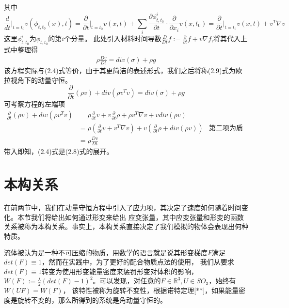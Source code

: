 其中$$\frac{d}{dt}\Big |_{t = t_0} v(\phi_{t,t_0}(x),t) = \frac{\partial}{\partial t}\Big |_{t = t_0}v(x,t) + \sum_i \frac{\partial \phi_{t,t_0}^i}{\partial t}  \cdot \frac{\partial}{\partial x_i}v(x,t_0) = \frac{\partial}{\partial t}\Big |_{t = t_0}v(x,t) + v^T\nabla v$$
这里$\phi_{t,t_0}^i$为$\phi_{t,t_0}$的第$i$个分量。
此处引入材料时间导数$\frac{D}{Dt}f := \frac{\partial}{\partial t} f + v\nabla f $,将其代入上式中整理得
\begin{equation}
    \begin{split}
        \rho \frac{Dv}{Dt} = div(\sigma) + \rho g
    \end{split}
\end{equation}
该方程实际与(2.4)式等价，由于其更简洁的表述形式，我们之后将称(2.9)式为欧拉视角下的动量守恒。
$$\frac{\partial}{\partial t}(\rho v) + div(\rho v^{T}v) = div(\sigma) + \rho g$$
可考察方程的左端项
\begin{align*}
    \frac{\partial}{\partial t}(\rho v) + div(\rho v^{T}v) & = \rho \frac{\partial}{\partial t} v + v \frac{\partial}{\partial t} \rho + \rho v^T\nabla v + v div(\rho v)                           \\
                                                           & = \rho (\frac{\partial}{\partial t} v + v^T\nabla v) + v(\frac{\partial}{\partial t} \rho + div(\rho v))     & \text{第二项为质量守恒} \\
                                                           & = \rho \frac{Dv}{Dt}
\end{align*}
带入即知，(2.4)式是(2.8)式的展开。

\section{本构关系}
在前两节中，我们在动量守恒方程中引入了应力项，其决定了速度如何随着时间变化。本节我们将给出如何通过形变来给出
应变张量，其中应变张量和形变的函数关系被称为本构关系。事实上，本构关系直接决定了我们模拟的物体会表现出何种特质。

流体被认为是一种不可压缩的物质，用数学的语言就是说其形变梯度$F$满足$det(F)\equiv 1$，然而在实践中，为了更好的配合物质点法的使用，
我们从要求$det(F)\equiv 1$转变为使用形变能量密度来惩罚形变对体积的影响，$W(F):= \frac{\lambda}{2} (det(F) - 1)^2$。可以发现，对任意的$F\in \mathbb{R}^3, U\in SO_3$，始终有$W(UF) = W(F)$，
该特性被称为旋转不变性，根据诺特定理[**]，如果能量密度是旋转不变的，那么所得到的系统是角动量守恒的。

